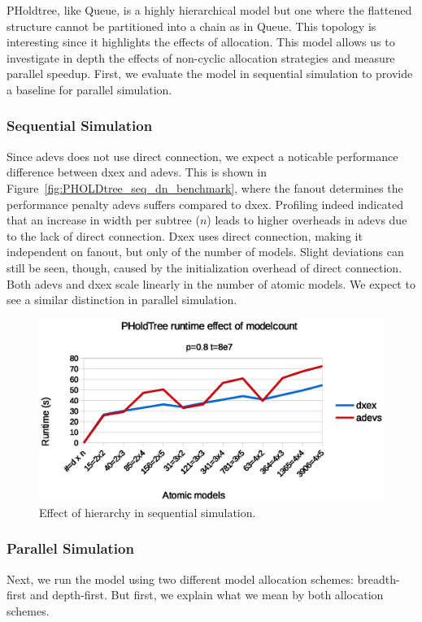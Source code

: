 PHoldtree, like Queue, is a highly hierarchical model but one where the flattened structure cannot be partitioned into a chain as in Queue.
This topology is interesting since it highlights the effects of allocation.
This model allows us to investigate in depth the effects of non-cyclic allocation strategies and measure parallel speedup.
First, we evaluate the model in sequential simulation to provide a baseline for parallel simulation.

\subsubsection{Sequential Simulation}
Since adevs does not use direct connection, we expect a noticable performance difference between dxex and adevs.
This is shown in Figure~\ref{fig:PHOLDtree_seq_dn_benchmark}, where the fanout determines the performance penalty adevs suffers compared to dxex.
Profiling indeed indicated that an increase in width per subtree ($n$) leads to higher overheads in adevs due to the lack of direct connection.
Dxex uses direct connection, making it independent on fanout, but only of the number of models.
Slight deviations can still be seen, though, caused by the initialization overhead of direct connection.
Both adevs and dxex scale linearly in the number of atomic models.
We expect to see a similar distinction in parallel simulation.

\begin{figure}
    \center
    \includegraphics[width=\plotfraction\columnwidth]{fig/pholdtree_sequential_dn.eps}
    \caption{Effect of hierarchy in sequential simulation.}
    \label{fig:PHoldtree_seq_dn_benchmark}
\end{figure}

\subsubsection{Parallel Simulation}
Next, we run the model using two different model allocation schemes: breadth-first and depth-first.
But first, we explain what we mean by both allocation schemes.

